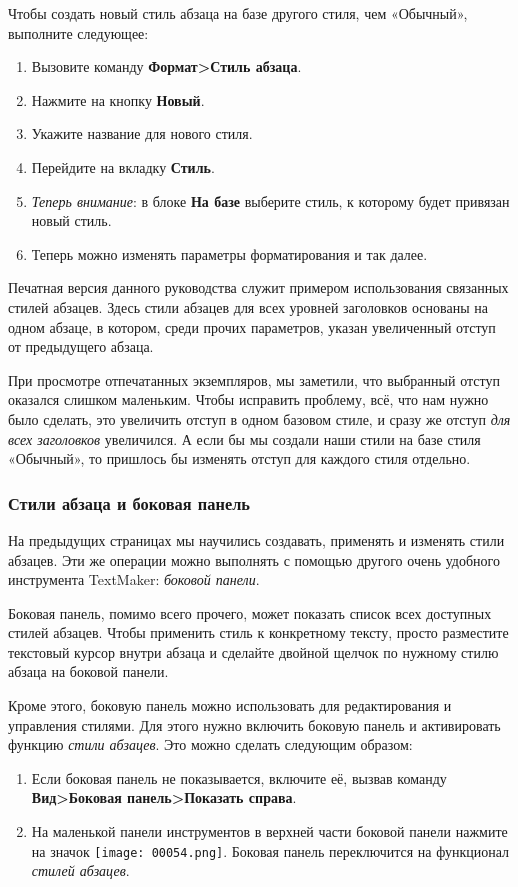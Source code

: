 ﻿\documentclass[a4paper,10pt]{article}
\begin{document}
Чтобы создать новый стиль абзаца на базе другого стиля, чем «Обычный», выполните следующее:
\begin{enumerate}
 \item Вызовите команду \textbf{Формат>Стиль абзаца}.
 \item Нажмите на кнопку \textbf{Новый}.
 \item Укажите название для нового стиля.
 \item Перейдите на вкладку \textbf{Стиль}.
 \item \textit{Теперь внимание}: в блоке \textbf{На базе} выберите стиль, к которому будет привязан новый стиль.
 \item Теперь можно изменять параметры форматирования и так далее.
\end{enumerate}

Печатная версия данного руководства служит примером использования связанных стилей абзацев. Здесь стили абзацев для всех уровней заголовков основаны на одном абзаце, в котором, среди прочих параметров, указан увеличенный отступ от предыдущего абзаца.

При просмотре отпечатанных экземпляров, мы заметили, что выбранный отступ оказался слишком маленьким. Чтобы исправить проблему, всё, что нам нужно было сделать, это увеличить отступ в одном базовом стиле, и сразу же отступ \textit{для всех заголовков} увеличился. А если бы мы создали наши стили на базе стиля «Обычный», то пришлось бы изменять отступ для каждого стиля отдельно.

\subsubsection{Стили абзаца и боковая панель} \label{sec:стилиабзибокпан}
На предыдущих страницах мы научились создавать, применять и изменять стили абзацев. Эти же операции можно выполнять с помощью другого очень удобного инструмента TextMaker: \textit{боковой панели}.

Боковая панель, помимо всего прочего, может показать список всех доступных стилей абзацев. Чтобы применить стиль к конкретному тексту, просто разместите текстовый курсор внутри абзаца и сделайте двойной щелчок по нужному стилю абзаца на боковой панели.

Кроме этого, боковую панель можно использовать для редактирования и управления стилями. Для этого нужно включить боковую панель и активировать функцию \textit{стили абзацев}. Это можно сделать следующим образом:
\begin{enumerate}
 \item Если боковая панель не показывается, включите её, вызвав команду \textbf{Вид>Боковая панель>Показать справа}.
 \item На маленькой панели инструментов в верхней части боковой панели нажмите на значок \texttt{[image: 00054.png]}. Боковая панель переключится на функционал \textit{стилей абзацев}. 
\end{enumerate}
\end{document}
